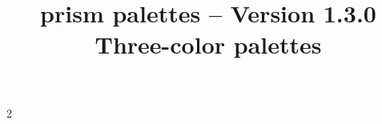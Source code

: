 \documentclass[theme = dark]{tutodoc}
\title{\raisebox{-.20ex}{@}prism palettes -- Version 1.3.0\\ Three-color palettes}
\date{}
\begin{document}
\maketitle{}

{
  \setlength{\columnsep}{2cm}
  \setlength{\columnseprule}{0.4pt}

  \begin{multicols}{2}
    \tableofcontents
  \end{multicols}
}

\newpage


















\end{document}

